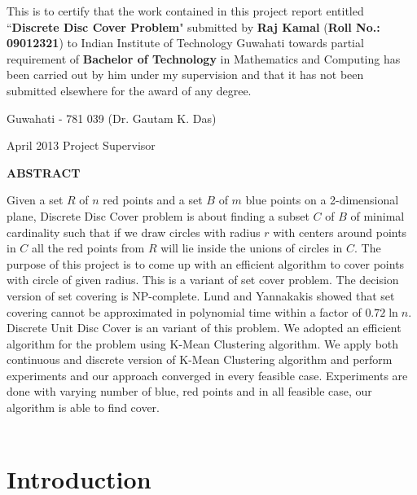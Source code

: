\documentclass[12pt,a4wide]{report}
\theoremstyle{plain}
\theoremstyle{definition}
\theoremstyle{remark}
\begin{document}
\noindent
This is to certify that the work contained in this project report
entitled ``{\bf Discrete Disc Cover Problem}" submitted
by {\bf Raj Kamal} ({\bf Roll No.: 09012321}) to Indian Institute of Technology Guwahati
towards partial requirement of {\bf Bachelor of Technology} in Mathematics and Computing  has been carried out
by him under my supervision and that it has not been submitted elsewhere
for the award of any degree.

\vspace{4cm}

\noindent Guwahati - 781 039 \hfill (Dr. Gautam K. Das)

\noindent April  2013 \hfill Project Supervisor


\clearpage

\begin{center}
{\Large{\bf{ABSTRACT}}}
\end{center}
Given a set $R$ of $n$ red points and a set $B$ of $m$ blue points on a 2-dimensional plane, Discrete Disc Cover problem
is about finding a subset $C$ of $B$ of minimal cardinality such
that if we draw  circles with radius $r$ with centers around points in $C$ all the red points from $R$ will lie
inside the unions of circles in $C$. The purpose of this project is to come up with an efficient algorithm  to  
cover points with circle of given radius. This is a variant of set cover problem. The decision version of set covering is 
NP-complete. Lund and  Yannakakis \cite{LY94} showed that set covering cannot be 
approximated in polynomial time within a factor of $0.72 \ln n$. Discrete Unit Disc Cover \cite{GRALB12} is an variant of this problem.
We adopted an efficient algorithm for the problem using K-Mean Clustering algorithm. We apply both continuous and discrete version
of K-Mean Clustering algorithm and perform experiments and our approach converged in every feasible case. Experiments are done with
varying number of blue, red points and in all feasible case, our algorithm is able to find cover.\\ \\

\clearpage
\tableofcontents
\newpage

\setcounter{page}{1}
\chapter {Introduction}
\end{document}
